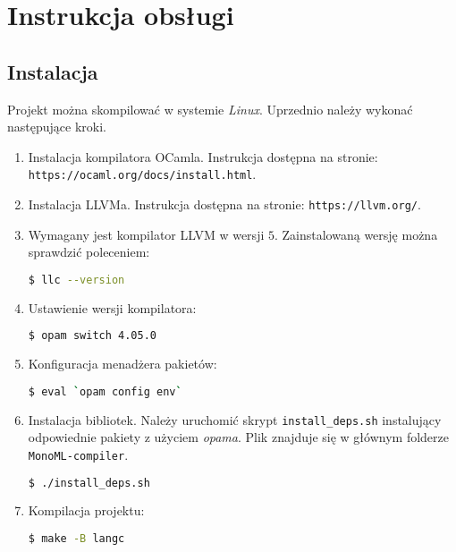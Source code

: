 \documentclass[declaration,shortabstract]{iithesis}
\begin{document}

\chapter{Instrukcja obsługi}

\section{Instalacja}

Projekt można skompilować w systemie \textit{Linux}.
Uprzednio należy wykonać następujące kroki. 

\begin{enumerate}
  \item Instalacja kompilatora OCamla. Instrukcja dostępna na stronie: \newline
  \texttt{https://ocaml.org/docs/install.html}.
  \item Instalacja LLVMa. Instrukcja dostępna na stronie: \newline
  \texttt{https://llvm.org/}.
  \item Wymagany jest kompilator LLVM w wersji $5$. Zainstalowaną 
  wersję można sprawdzić poleceniem:
  \begin{lstlisting}[language=bash]
  $ llc --version
  \end{lstlisting}
  \item Ustawienie wersji kompilatora:
  \begin{lstlisting}[language=bash]
  $ opam switch 4.05.0
  \end{lstlisting}
  \item Konfiguracja menadżera pakietów:
  \begin{lstlisting}[language=bash]
  $ eval `opam config env`
  \end{lstlisting}
  \item Instalacja bibliotek. Należy uruchomić skrypt \texttt{install\_deps.sh}
   instalujący odpowiednie pakiety z użyciem \textit{opama}. Plik znajduje się 
   w głównym folderze 
  \texttt{MonoML-compiler}. 
  \begin{lstlisting}[language=bash]
  $ ./install_deps.sh
  \end{lstlisting}
  \item Kompilacja projektu:
  \begin{lstlisting}[language=bash]
  $ make -B langc
  \end{lstlisting}
\end{enumerate}
\end{document}
